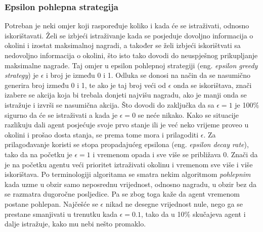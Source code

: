 \subsubsection{Epsilon pohlepna strategija}
Potreban je neki omjer koji raspoređuje koliko i kada će se istraživati, odnosno iskorištavati. Želi se izbjeći istraživanje kada se posjeduje dovoljno informacija o okolini i izostat maksimalnoj nagradi, a također se želi izbjeći iskorištvati sa nedovoljno informacija o okolini, što isto tako dovodi do neuspješnog prikupljanje maksimalne nagrade. Taj omjer u epsilon pohlepnoj strategiji (eng. \textit{epsilon greedy strategy}) je $\epsilon$ i broj je između 0 i 1. Odluka se donosi na način da se nasumično generira broj između 0 i 1, te ako je taj broj veći od $\epsilon$ onda se iskorištava, znači izabere se akcija koja bi trebala donjeti najvišu nagradu, ako je manji onda se istražuje i izvrši se nasumična akcija. Što dovodi do zaključka da sa $\epsilon = 1$ je 100\% sigurno da će se istraživati a kada je $\epsilon = 0$ se neće nikako. Kako se situacije razlikuju dali agent posjećuje svoje prvo stanje ili je već neko vrijeme proveo u okolini i prošao dosta stanja, se prema tome mora i prilagoditi $\epsilon$. Za prilagođavanje koristi se stopa propadajućeg epsilona (eng. \textit{epsilon decay rate}), tako da na početku je $\epsilon = 1$ i vremenom opada i sve više se približava 0. Znači da je na početku agentu veći prioritet iztraživati okolinu i vremenom sve više i više iskorištava. Po terminologiji algoritama se smatra nekim algoritmom \emph{pohlepnim} kada uzme u obzir samo neposrednu vrijednost, odnosno nagradu, u obzir bez da se razmatra dugoročne posljedice. Pa se zbog toga kaže da agent vremenom postane pohlepan. Najčešće se $\epsilon$ nikad ne desegne vrijednost nule, nego ga se prestane smanjivati u trenutku kada $\epsilon = 0.1$, tako da u 10\% skučajeva agent i dalje istražuje, kako mu nebi nešto promaklo.

